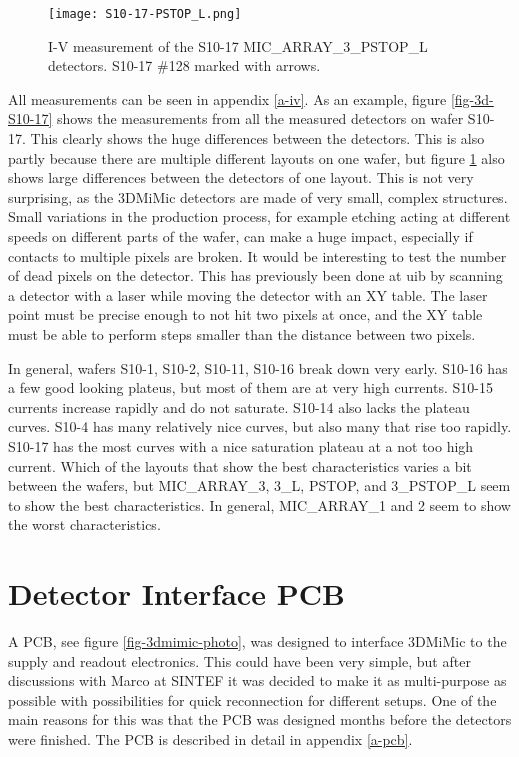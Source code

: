 \documentclass[../main/thesis.tex]{subfiles}
\begin{document}
\begin{figure}%
	\centering
	\texttt{[image: S10-17-PSTOP\_L.png]}
	\caption{I-V measurement of the S10-17 MIC\_ARRAY\_3\_PSTOP\_L detectors. S10-17 \#128 marked with arrows.}
	\label{fig-3d-S10-17-PSTOP_L} 
\end{figure}

All measurements can be seen in appendix \ref{a-iv}. As an example, figure \ref{fig-3d-S10-17} shows the measurements from all the measured detectors on wafer S10-17. This clearly shows the huge differences between the detectors. This is also partly because there are multiple different layouts on one wafer, but figure \ref{fig-3d-S10-17-PSTOP_L} also shows large differences between the detectors of one layout. This is not very surprising, as the 3DMiMic detectors are made of very small, complex structures. Small variations in the production process, for example etching acting at different speeds on different parts of the wafer, can make a huge impact, especially if contacts to multiple pixels are broken. It would be interesting to test the number of dead pixels on the detector. This has previously been done at \gls{uib} by scanning a detector with a laser while moving the detector with an XY table. The laser point must be precise enough to not hit two pixels at once, and the XY table must be able to perform steps smaller than the distance between two pixels.  

In general, wafers S10-1, S10-2, S10-11, S10-16 break down very early. S10-16 has a few good looking plateus, but most of them are at very high currents. S10-15 currents increase rapidly and do not saturate. S10-14 also lacks the plateau curves. S10-4 has many relatively nice curves, but also many that rise too rapidly. S10-17 has the most curves with a nice saturation plateau at a not too high current. Which of the layouts that show the best characteristics varies a bit between the wafers, but MIC\_ARRAY\_3, 3\_L, PSTOP, and 3\_PSTOP\_L seem to show the best characteristics. In general, MIC\_ARRAY\_1 and 2 seem to show the worst characteristics. 

\section{Detector Interface PCB}
\label{3d-pcb}
A \gls{PCB}, see figure \ref{fig-3dmimic-photo}, was designed to interface 3DMiMic to the supply and readout electronics. This could have been very simple, but after discussions with Marco at SINTEF it was decided to make it as multi-purpose as possible with possibilities for quick reconnection for different setups. One of the main reasons for this was that the PCB was designed months before the detectors were finished. The PCB is described in detail in appendix \ref{a-pcb}.
\end{document}
